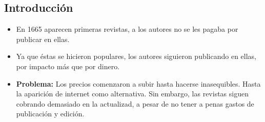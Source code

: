 \documentclass[a0,portrait]{a0poster}
\begin{document}

\begin{multicols}{2} %



\color{Black} %
  \section*{Introducción}
  \begin{itemize}
  \item En 1665 aparecen primeras revistas, a los autores no se les pagaba por publicar en ellas.
  \item Ya que éstas se hicieron populares, los autores siguieron publicando en ellas, por impacto más que por dinero.
  \item \textbf{Problema:} Los precios comenzaron a subir hasta hacerse inasequibles. Hasta la aparición de internet como alternativa. Sin embargo, las revistas siguen cobrando demasiado en la actualizad, a pesar de no tener a penas gastos de publicación y edición.
  \end{itemize}


\end{multicols}
\end{document}
